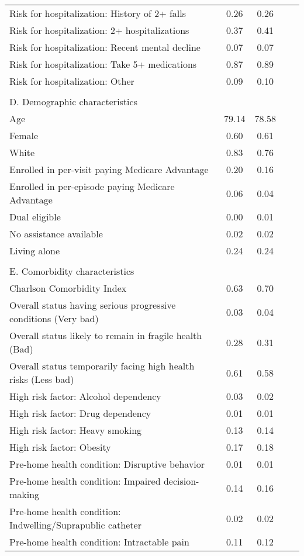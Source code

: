 \documentclass[final,12pt]{article}
\begin{document}
\begin{singlespace}
\begin{table}[H]
\begin{threeparttable}
\begin{tabular}{l*{4}c}
Risk for hospitalization: History of 2+ falls & 0.26 & 0.26 \\
Risk for hospitalization: 2+ hospitalizations  & 0.37  & 0.41 \\
Risk for hospitalization: Recent mental decline  & 0.07  & 0.07 \\
Risk for hospitalization: Take 5+ medications  & 0.87  & 0.89 \\
Risk for hospitalization: Other  & 0.09  & 0.10 \\
\\
\multicolumn{3}{l}{D. Demographic characteristics}\\
Age  & 79.14  & 78.58 \\
Female  & 0.60  & 0.61 \\
White  & 0.83  & 0.76 \\
Enrolled in per-visit paying Medicare Advantage  & 0.20  & 0.16 \\
Enrolled in per-episode paying Medicare Advantage  & 0.06  & 0.04 \\
Dual eligible  & 0.00  & 0.01 \\
No assistance available  & 0.02  & 0.02 \\
Living alone  & 0.24  & 0.24 \\
\\
\multicolumn{3}{l}{E. Comorbidity characteristics}\\
Charlson Comorbidity Index  & 0.63  & 0.70 \\
Overall status having serious progressive conditions (Very bad)  & 0.03  & 0.04 \\
Overall status likely to remain in fragile health (Bad)  & 0.28  & 0.31 \\
Overall status temporarily facing high health risks (Less bad)  & 0.61  & 0.58 \\
High risk factor: Alcohol dependency  & 0.03  & 0.02 \\
High risk factor: Drug dependency  & 0.01  & 0.01 \\
High risk factor: Heavy smoking  & 0.13  & 0.14 \\
High risk factor: Obesity  & 0.17  & 0.18 \\
Pre-home health condition: Disruptive behavior  & 0.01  & 0.01 \\
Pre-home health condition: Impaired decision-making  & 0.14  & 0.16 \\
Pre-home health condition: Indwelling/Suprapublic catheter  & 0.02  & 0.02 \\
Pre-home health condition: Intractable pain  & 0.11  & 0.12 \\

\end{tabular}
\end{threeparttable}
\end{table}
\end{singlespace}
\end{document}
